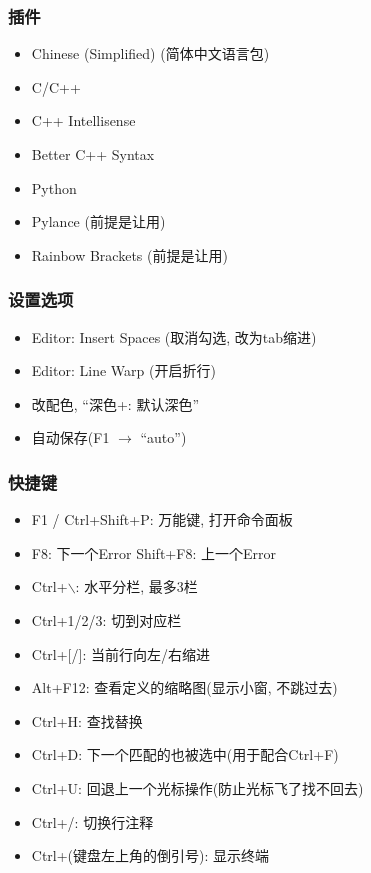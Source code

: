 \subsubsection{插件}

\begin{itemize}
	\item Chinese (Simplified) (简体中文语言包)
	\item C/C++
	\item C++ Intellisense
	\item Better C++ Syntax
	\item Python
	\item Pylance (前提是让用)
	\item Rainbow Brackets (前提是让用)
\end{itemize}

\subsubsection{设置选项}

\begin{itemize}
	\item Editor: Insert Spaces (取消勾选, 改为tab缩进)
	\item Editor: Line Warp (开启折行)
	\item 改配色, ``深色+: 默认深色''
	\item 自动保存(F1 $\rightarrow$ ``auto'')
\end{itemize}

\subsubsection{快捷键}

\begin{itemize}
	\item F1 / Ctrl+Shift+P: 万能键, 打开命令面板
	\item F8: 下一个Error  Shift+F8: 上一个Error
	\item Ctrl+$\backslash$: 水平分栏, 最多3栏
	\item Ctrl+1/2/3: 切到对应栏
	\item Ctrl+[/]: 当前行向左/右缩进
	\item Alt+F12: 查看定义的缩略图(显示小窗, 不跳过去)
	\item Ctrl+H: 查找替换
	\item Ctrl+D: 下一个匹配的也被选中(用于配合Ctrl+F)
	\item Ctrl+U: 回退上一个光标操作(防止光标飞了找不回去)
	\item Ctrl+/: 切换行注释
	\item Ctrl+(键盘左上角的倒引号): 显示终端
\end{itemize}